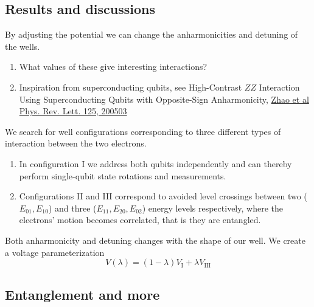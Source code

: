 \documentclass[%
oneside,                 %
final,                   %
10pt]{article}
\begin{document}
\subsection{Results and discussions}
By adjusting the potential we can change the anharmonicities and detuning of the wells.
\begin{enumerate}
\item What values of these give interesting interactions?

\item Inspiration from superconducting qubits, see High-Contrast $ZZ$ Interaction Using Superconducting Qubits with Opposite-Sign Anharmonicity, \href{{https://journals.aps.org/prl/abstract/10.1103/PhysRevLett.125.200503}}{Zhao et al Phys. Rev. Lett. 125, 200503}
\end{enumerate}

\noindent
We search for well configurations corresponding to three different types of interaction between the two electrons.

\begin{enumerate}
\item In configuration I we address both qubits independently and can thereby perform single-qubit state rotations and measurements.

\item Configurations II and III correspond to avoided level crossings between two ($E_{01}, E_{10}$) and three ($E_{11}, E_{20}, E_{02}$) energy levels respectively, where the electrons' motion becomes correlated, that is they are entangled. 
\end{enumerate}

\noindent
Both anharmonicity and detuning changes with the shape of our well.
We create a voltage parameterization
\begin{equation}
V(\lambda) = (1-\lambda)V_\mathrm{I} + \lambda V_\mathrm{III}
\end{equation}

\subsection{Entanglement and more}

\vspace{6mm}
\end{document}
